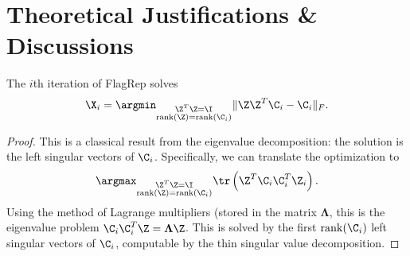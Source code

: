 

\section{Theoretical Justifications \& Discussions}\label{sec:proofs}
\begin{prop}%
    The $i$th iteration of FlagRep solves 
    \begin{equation}
        \X_{i} = \argmin_{\substack{\Z^T\Z = \I \\ \text{rank}(\Z) = \text{rank}(\C_i)}} \| \Z \Z^T \C_i - \C_i \|_F.
    \end{equation}
\end{prop}
\begin{proof}
    This is a classical result from the eigenvalue decomposition: the solution is the left singular vectors of $\C_i$. Specifically, we can translate the optimization to
    \begin{equation}
        \argmax_{\substack{\Z^T\Z = \I \\ \text{rank}(\Z) = \text{rank}(\C_i)}} \tr\left( \Z^T \C_i\C_i^T \Z_i \right).
    \end{equation}
    Using the method of Lagrange multipliers (stored in the matrix $\mathbf{\Lambda}$, this is the eigenvalue problem $\C_i \C_i^T\Z = \mathbf{\Lambda} \Z$.
    This is solved by the first $\mathrm{rank}(\C_i)$ left singular vectors of $\C_i$, computable by the thin singular value decomposition.
\end{proof}

